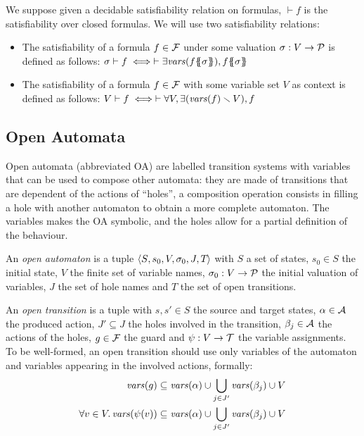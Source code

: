 \documentclass[runningheads]{llncs}
\begin{document}
 We suppose given a decidable satisfiability relation on formulas, \({\vdash} f\) is the satisfiability over closed formulas.
We will  use two satisfiability relations:
\begin{itemize}
\item The satisfiability of a formula \(f \in {\mathcal{F}}\) under some valuation \(\sigma: V \to \mathcal{P}\) is defined as follows:
\( \sigma \vdash f \iff \vdash \exists \fvars{f\psubst{\sigma}}, f\psubst{\sigma} \)
\item The satisfiability of a formula \(f \in {\mathcal{F}}\) with some variable set \(V\) as context is defined as follows:
\( V \vdash f \iff  \vdash \forall V, \exists{\left(\mathit{vars}{\left(f\right)} \smallsetminus V\right)}, f \)
\end{itemize}


\subsection{Open Automata}\label{sec:def}
 Open automata (abbreviated OA) are labelled transition systems with variables  that can be used to compose other automata: they are made of transitions that are dependent of the actions of ``holes'', a composition operation consists in filling a hole with another automaton to obtain a more complete automaton. The variables makes the OA symbolic, and the holes allow for a partial definition of the behaviour.

\begin{definition}
An \emph{open automaton} is a tuple \(\left<S_{},s_{0},V_{},\sigma_{0},J_{},T_{}\right>\) with \(S\) a set of states, \(s_0 \in S\) the initial state, \(V\) the finite set of variable names, \(\sigma_0: V \to \mathcal{P}\) the initial valuation of variables, \(J\) the set of hole names and \(T\) the set of open transitions. 

An \emph{open transition} is a tuple \nmm{\OTg} with \(s, s' \in S\) the source and target states, \(\alpha \in \mathcal{A}\) the produced action, \(J' \subseteq J\) the holes involved in the transition, \(\beta_j \in \mathcal{A}\) the actions of the holes, \(g \in {\mathcal{F}}\) the guard and \(\psi: V \to {\mathcal{T}}\) the variable assignments.
To be well-formed, an open transition should use only variables of the automaton and variables appearing in the involved actions, formally: 
\begin{align*}
\mathit{vars}{\left(g\right)}&\subseteq \mathit{vars}{\left(\alpha\right)}\cup \bigcup_{j \in J'} \mathit{vars}{\left(\beta_j\right)} \cup V \\ \forall v\in V.\, \mathit{vars}{\left(\psi(v)\right)}&\subseteq \mathit{vars}{\left(\alpha\right)}\cup \bigcup_{j \in J'} \mathit{vars}{\left(\beta_j\right)} \cup V
\end{align*}
\end{definition}
\end{document}
